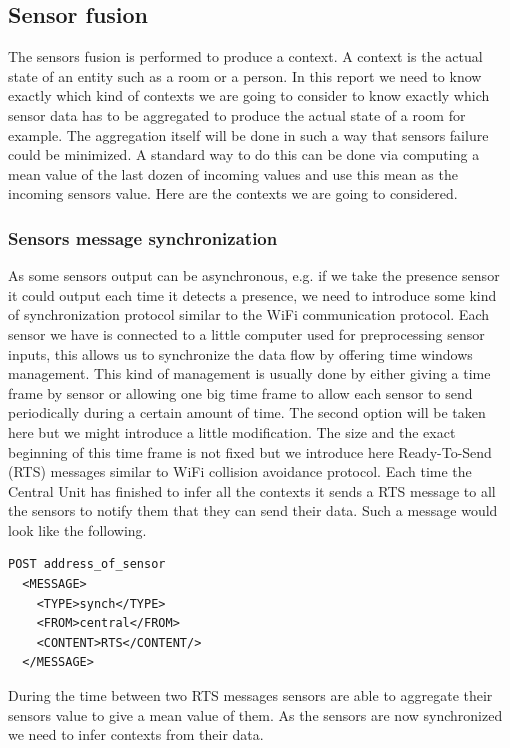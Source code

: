 \documentclass{acm_proc_article-sp}
\begin{document}
\subsection{Sensor fusion}
The sensors fusion is performed to produce a context. A context is the actual state of an entity such as a room or a person. 
In this report we need to know exactly which kind of contexts we are going to consider to know exactly which sensor data has to be aggregated to produce the actual state of a room for example. 
The aggregation itself will be done in such a way that sensors failure could be minimized.
A standard way to do this can be done via computing a mean value of the last dozen of incoming values and use this mean as the incoming sensors value.
Here are the contexts we are going to considered.
\subsubsection{Sensors message synchronization}
As some sensors output can be asynchronous, e.g. if we take the presence sensor it could output each time it detects a presence, we need to introduce some kind of synchronization protocol similar to the WiFi communication protocol.
Each sensor we have is connected to a little computer used for preprocessing sensor inputs, this allows us to synchronize the data flow by offering time windows management.
This kind of management is usually done by either giving a time frame by sensor or allowing one big time frame to allow each sensor to send periodically during a certain amount of time.
The second option will be taken here but we might introduce a little modification. 
The size and the exact beginning of this time frame is not fixed but we introduce here Ready-To-Send (RTS) messages similar to WiFi collision avoidance protocol.
Each time the Central Unit has finished to infer all the contexts it sends a RTS message to all the sensors to notify them that they can send their data.
Such a message would look like the following.
\begin{verbatim}
POST address_of_sensor 
  <MESSAGE>
    <TYPE>synch</TYPE>
    <FROM>central</FROM>
    <CONTENT>RTS</CONTENT/>
  </MESSAGE> 
\end{verbatim}
During the time between two RTS messages sensors are able to aggregate their sensors value to give a mean value of them.
As the sensors are now synchronized we need to infer contexts from their data.
\end{document}
